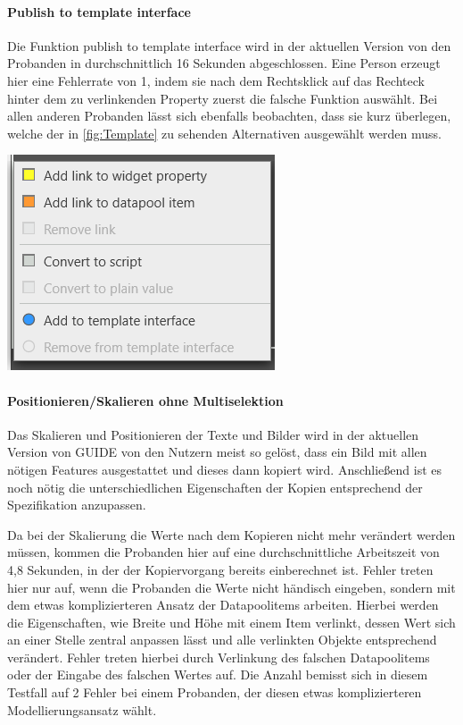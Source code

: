 \paragraph{Publish to template interface}
Die Funktion \glqq publish to template interface\grqq{} wird in der aktuellen Version von den Probanden in durchschnittlich 16 Sekunden abgeschlossen.
Eine Person erzeugt hier eine Fehlerrate von 1, indem sie nach dem Rechtsklick auf das Rechteck hinter dem zu verlinkenden Property zuerst die falsche Funktion auswählt.
Bei allen anderen Probanden lässt sich ebenfalls beobachten, dass sie kurz überlegen, welche der in \cref{fig:Template} zu sehenden Alternativen ausgewählt werden muss.
\begin{center}
  \includegraphics[scale= 0.8]{figures/Template.PNG}
  \label{fig:Template}
\end{center}

\paragraph{Positionieren/Skalieren ohne Multiselektion}
Das Skalieren und Positionieren der Texte und Bilder wird in der aktuellen Version von GUIDE  von den Nutzern meist so gelöst, dass ein Bild mit allen nötigen Features ausgestattet und dieses dann kopiert wird.
Anschließend ist es noch nötig die unterschiedlichen Eigenschaften der Kopien entsprechend der Spezifikation anzupassen.

Da bei der Skalierung die Werte nach dem Kopieren nicht mehr verändert werden müssen, kommen die Probanden hier auf eine durchschnittliche Arbeitszeit von 4,8 Sekunden, in der der Kopiervorgang bereits einberechnet ist.
Fehler treten hier nur auf, wenn die Probanden die Werte nicht händisch eingeben, sondern mit dem etwas komplizierteren Ansatz der Datapoolitems arbeiten.
Hierbei werden die Eigenschaften, wie Breite und Höhe mit einem Item verlinkt, dessen Wert sich an einer Stelle zentral anpassen lässt und alle verlinkten Objekte entsprechend verändert.
Fehler treten hierbei durch Verlinkung des falschen Datapoolitems oder der Eingabe des falschen Wertes auf.
Die Anzahl bemisst sich in diesem Testfall auf 2 Fehler bei einem Probanden, der diesen etwas komplizierteren Modellierungsansatz wählt.

